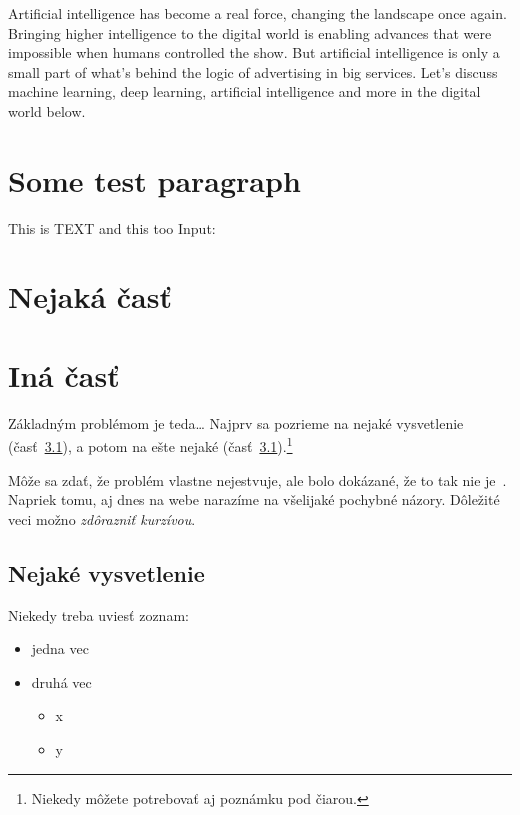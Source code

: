 \documentclass[10pt,twoside,a4paper,english]{article}
\begin{document}
	Artificial intelligence has become a real force, changing the landscape once again. Bringing higher intelligence to the digital world is enabling advances that were impossible when humans controlled the show. But artificial intelligence is only a small part of what's behind the logic of advertising in big services. Let's discuss machine learning, deep learning, artificial intelligence and more in the digital world below.\cite{10314235}\par

	\endgroup


	\section{Some test paragraph}
	This is TEXT and this too \newline
	Input: 


	\section{Nejaká časť} \label{nejaka}

	\section{Iná časť} \label{ina}

	Základným problémom je teda\ldots{} Najprv sa pozrieme na nejaké vysvetlenie (časť~\ref{ina:nejake}), a potom na ešte nejaké (časť~\ref{ina:nejake}).\footnote{Niekedy môžete potrebovať aj poznámku pod čiarou.}

	Môže sa zdať, že problém vlastne nejestvuje\cite{Coplien:MPD}, ale bolo dokázané, že to tak nie je~\cite{Czarnecki:Staged, Czarnecki:Progress}. Napriek tomu, aj dnes na webe narazíme na všelijaké pochybné názory\cite{PLP-Framework}. Dôležité veci možno \emph{zdôrazniť kurzívou}.


	\subsection{Nejaké vysvetlenie} \label{ina:nejake}

	Niekedy treba uviesť zoznam:

	\begin{itemize}
		\item jedna vec
		\item druhá vec
		\begin{itemize}
			\item x
			\item y
		\end{itemize}
	\end{itemize}
\end{document}
